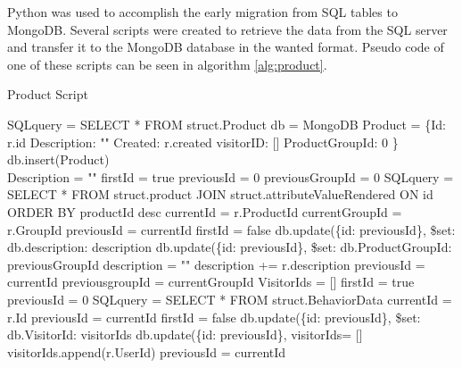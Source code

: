 Python was used to accomplish the early migration from SQL tables to MongoDB. Several scripts were created to retrieve the data from the SQL server and transfer it to the MongoDB database in the wanted format. Pseudo code of one of these scripts can be seen in algorithm \ref{alg:product}. \\


\begin{algorithm}
\caption{Product Script}
\label{alg:product}
\begin{algorithmic}[1]
	\State SQLquery = SELECT * FROM struct.Product
	\State  db = MongoDB
	\State   Product = \{Id: r.id 
	\State	\hspace{1cm}		Description: "" 
	\State	\hspace{1cm}		Created: r.created 
	\State	\hspace{1cm}	visitorID: [] 
	\State \hspace{1cm}	ProductGroupId: 0 \}
	\State db.insert(Product)
	\EndFor
	\\
	\State Description = ""
	\State	firstId = true
	\State previousId = 0
	\State previousGroupId = 0
	\State SQLquery = SELECT * FROM struct.product JOIN struct.attributeValueRendered ON id ORDER BY productId desc
	\State currentId = r.ProductId
	\State currentGroupId = r.GroupId
	\State previousId = currentId
	\State firstId = false
	\EndIf
	\State db.update(\{id: previousId\},
	\State \hspace{1cm} \$set: db.description: description
		\State db.update(\{id: previousId\},
	\State \hspace{1cm} \$set: db.ProductGroupId: previousGroupId
	\State description = ""
	\EndIf
	\State description += r.description
	\State previousId = currentId
	\State previousgroupId = currentGroupId
	\EndFor
	\State VisitorIds = []
	\State firstId = true
	\State previousId = 0
	\State SQLquery = SELECT * FROM struct.BehaviorData
	\State currentId = r.Id
	\State previousId = currentId
	\State firstId = false
	\EndIf
	\State db.update(\{id: previousId\},
	\State \hspace{1cm} \$set: db.VisitorId: visitorIds
		\State db.update(\{id: previousId\},
	\State visitorIds= []
	\EndIf
	\State visitorIds.append(r.UserId)
	\State previousId = currentId
	\EndFor
\end{algorithmic}
\end{algorithm}

